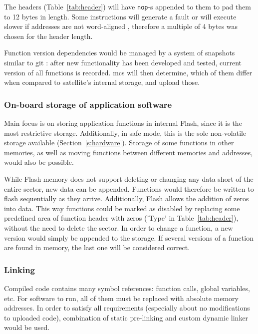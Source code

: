 The headers (Table~\ref{tab:header}) will have \texttt{nop}-s appended to them to pad them to 12 bytes in length. Some instructions will generate a fault or will execute slower if addresses are not word-aligned \cite[Section~3.3.5]{STMicroelectronics2017}, therefore a multiple of 4 bytes was chosen for the header length.

Function version dependencies would be managed by a system of snapshots similar to git \cite[Chapter~1.3]{Chacon2018}: after new functionality has been developed and tested, current version of all functions is recorded. \Gls{mcs} will then determine, which of them differ when compared to satellite's internal storage, and upload those.

\subsubsection{On-board storage of application software}

Main focus is on storing application functions in internal Flash, since it is the most restrictive storage. Additionally, in safe mode, this is the sole non-volatile storage available (Section~\ref{s:hardware}). Storage of some functions in other memories, as well as moving functions between different memories and addresses, would also be possible.

While Flash memory does not support deleting or changing any data short of the entire sector, new data can be appended. Functions would therefore be written to flash sequentially as they arrive. Additionally, Flash allows the addition of zeros into data. This way functions could be marked as disabled by replacing some predefined area of function header with zeros ('Type' in Table~\ref{tab:header}), without the need to delete the sector. In order to change a function, a new version would simply be appended to the storage. If several versions of a function are found in memory, the last one will be considered correct.

\subsubsection{Linking}

Compiled code contains many symbol references: function calls, global variables, etc. For software to run, all of them must be replaced with absolute memory addresses. In order to satisfy all requirements (especially about no modifications to uploaded code), combination of static pre-linking and custom dynamic linker would be used.

